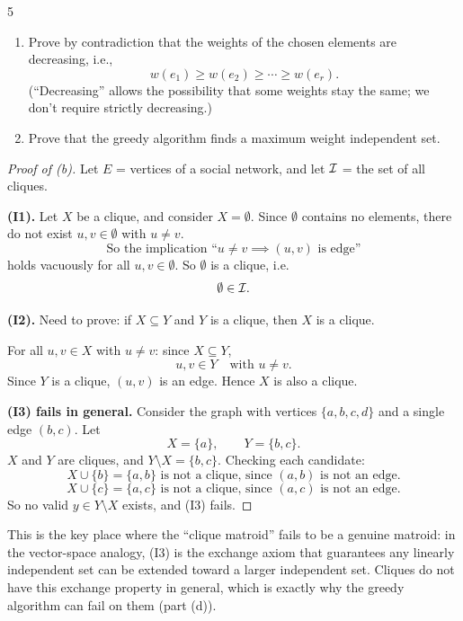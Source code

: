 \documentclass[11pt]{article}
\begin{document}
\begin{exercise}{5}
\begin{enumerate}[label=(\alph*)]
        \item Prove by contradiction that the weights of the chosen
            elements are decreasing, i.e.,
            \[
                w(e_1) \ge w(e_2) \ge \cdots \ge w(e_r).
            \]
            (``Decreasing'' allows the possibility that some weights
            stay the same; we don't require strictly decreasing.)

        \item Prove that the greedy algorithm finds a maximum weight
            independent set.
    \end{enumerate}
\end{exercise}

\begin{solution}[(a)]
\end{solution}

\begin{solution}[(b)]
\begin{proof}[Proof of (b)]
    Let $E$ = vertices of a social network, and let $\mathcal{I}$ = the set of
    all cliques.

    \medskip
    \textbf{(I1).} Let $X$ be a clique, and consider $X = \emptyset$.
    Since $\emptyset$ contains no elements, there do not exist
    $u,v\in\emptyset$ with $u\ne v$.
    \[
        \text{So the implication ``}u\ne v \implies (u,v)\text{ is
        edge''}
    \]
    holds vacuously for all $u,v\in\emptyset$. So $\emptyset$ is a
    clique, i.e.
    \[
        \emptyset\in\mathcal{I}.
    \]

    \medskip
    \textbf{(I2).} Need to prove: if $X\subseteq Y$ and $Y$ is a
    clique, then $X$ is a clique.

    For all $u,v\in X$ with $u\ne v$: since $X\subseteq Y$,
    \[
        u,v\in Y \quad \text{with } u\ne v.
    \]
    Since $Y$ is a clique, $(u,v)$ is an edge. Hence $X$ is also a
    clique.

    \medskip
    \textbf{(I3) fails in general.} Consider the graph with vertices
    $\{a,b,c,d\}$ and a single edge $(b,c)$. Let
    \[
        X=\{a\}, \qquad Y=\{b,c\}.
    \]
    $X$ and $Y$ are cliques, and $Y\setminus X = \{b,c\}$. Checking
    each candidate:
    \[
        X\cup\{b\} = \{a,b\} \text{ is not a clique, since } (a,b)
        \text{ is not an edge.}
    \]
    \[
        X\cup\{c\} = \{a,c\} \text{ is not a clique, since } (a,c)
        \text{ is not an edge.}
    \]
    So no valid $y\in Y\setminus X$ exists, and (I3) fails.
\end{proof}

\begin{remark}
    This is the key place where the ``clique matroid'' fails to be a
    genuine matroid: in the vector-space analogy, (I3) is the
    exchange axiom that guarantees any linearly independent set can
    be extended toward a larger independent set. Cliques do not have
    this exchange property in general, which is exactly why the
    greedy algorithm can fail on them (part (d)).
\end{remark}
\end{solution}
\end{document}
